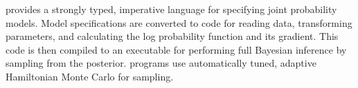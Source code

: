 
  \Stan provides a strongly typed, imperative language for specifying
  joint probability models.  Model specifications are converted to
  \Cpp code for reading data, transforming parameters, and calculating
  the log probability function and its gradient.  This \Cpp code is
  then compiled to an executable for performing full Bayesian
  inference by sampling from the posterior.  \Stan programs use
  automatically tuned, adaptive Hamiltonian Monte Carlo for sampling.

